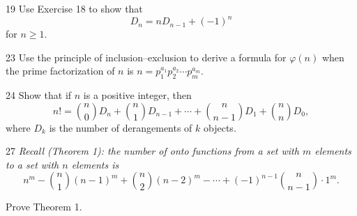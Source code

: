 \documentclass[11pt]{article}
\begin{document}
\begin{exercise}{19}
    Use Exercise 18 to show that
    \[
    D_n = nD_{n-1} + (-1)^n
    \]
    for $n \geq 1$.
\end{exercise}

\begin{exercise}{23}
    Use the principle of inclusion--exclusion to derive a formula for
    $\varphi(n)$ when the prime factorization of $n$ is
    $n = p_1^{a_1} p_2^{a_2} \cdots p_m^{a_m}$.
\end{exercise}

\begin{exercise}{24}
    Show that if $n$ is a positive integer, then
    \[
    n! = \binom{n}{0} D_n + \binom{n}{1} D_{n-1} + \cdots +
    \binom{n}{n-1} D_1 + \binom{n}{n} D_0,
    \]
    where $D_k$ is the number of derangements of $k$ objects.
\end{exercise}

\begin{exercise}{27}
    \textit{Recall (Theorem 1): the number of onto functions from a
    set with $m$ elements to a set with $n$ elements is
    \[
    n^m - \binom{n}{1}(n-1)^m + \binom{n}{2}(n-2)^m - \cdots +
    (-1)^{n-1}\binom{n}{n-1} \cdot 1^m.
    \]}

    Prove Theorem 1.
\end{exercise}
\end{document}
